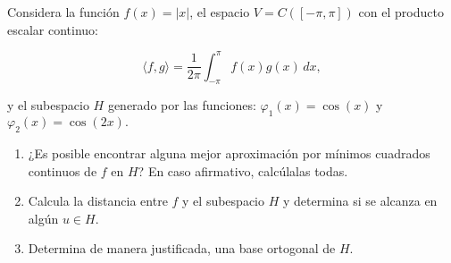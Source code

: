 \documentclass[12pt]{article}
\begin{document}
	\begin{ejercicio}[4 puntos]
		Considera la función $f(x) = |x|$, el espacio $V = C\left([-\pi, \pi]\right)$ con el producto escalar continuo:
		
		$$\langle f, g \rangle = \frac{1}{2\pi} \int_{-\pi}^{\pi} f(x)g(x) \, dx,$$
		
		y el subespacio $H$ generado por las funciones: $\varphi_1(x) = \cos(x)$ y $\varphi_2(x) = \cos(2x).$
		
		\begin{enumerate}[label=\alph*)]
			\item ¿Es posible encontrar alguna mejor aproximación por mínimos cuadrados continuos de $f$ en $H$? En caso afirmativo, calcúlalas todas.
			
			\item Calcula la distancia entre $f$ y el subespacio $H$ y determina si se alcanza en algún $u \in H$.
			
			\item Determina de manera justificada, una base ortogonal de $H$.
		\end{enumerate}
	\end{ejercicio}
	
\end{document}
